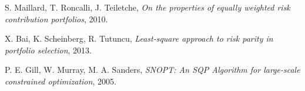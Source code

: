 S. Maillard, T. Roncalli, J. Teiletche,
\emph{On the properties of equally weighted risk contribution portfolios}, 
2010.

  X. Bai, K. Scheinberg, R. Tutuncu,
  \emph{Least-square approach to risk parity in portfolio selection},
  2013.   
  
	P. E. Gill, W. Murray, M. A. Sanders,
	\emph{SNOPT: An SQP Algorithm for large-scale constrained optimization}, 
	2005.
